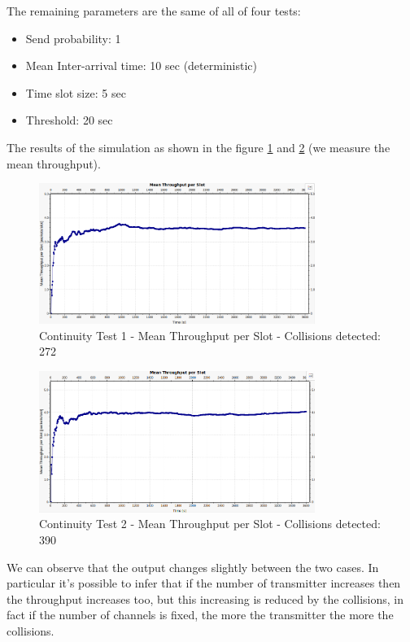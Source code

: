 \noindent The remaining parameters are the same of all of four tests:
\begin{itemize}
	\item Send probability: 1
	\item Mean Inter-arrival time: 10 sec (deterministic)
	\item Time slot size: 5 sec
	\item Threshold: 20 sec
\end{itemize}

\noindent The results of the simulation as shown in the figure \ref{img: continuityTest1a} and \ref{img: continuityTest1b} (we measure the mean throughput).

\begin{figure}[H]
	\centering
	\includegraphics[width=0.8\textwidth]{img/continuityTest1a.png}
	\caption{Continuity Test 1 - Mean Throughput per Slot - Collisions detected: 272}
	\label {img: continuityTest1a}
\end{figure}

\begin{figure}[H]
	\centering
	\includegraphics[width=0.8\textwidth]{img/continuityTest1b.png}
	\caption{Continuity Test 2 - Mean Throughput per Slot - Collisions detected: 390}
	\label {img: continuityTest1b}
\end{figure}

\noindent We can observe that the output changes slightly between the two cases. In particular it's possible to infer that if the number of transmitter increases then the throughput increases too, but this increasing is reduced by the collisions, in fact if the number of channels is fixed, the more the transmitter the more the collisions.

